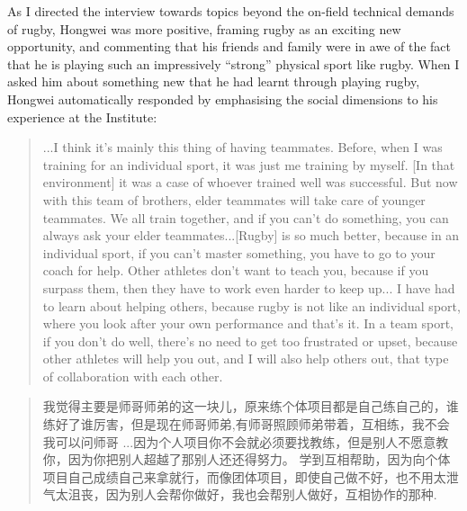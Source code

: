 \begin{CJK}{UTF8}{gbsn}
As I directed the interview towards topics beyond the on-field technical demands of rugby, Hongwei was more positive, framing rugby as an exciting new opportunity, and commenting that his friends and family were in awe of the fact that he is playing such an impressively ``strong'' physical sport like rugby.  When I asked him about something new that he had learnt through playing rugby, Hongwei automatically responded by emphasising the social dimensions to his experience at the Institute:

  \begin{quote}
    ...I think it's mainly this thing of having teammates. Before, when I was training for an individual sport, it was just me training by myself. [In that environment] it was a case of whoever trained well was successful.  But now with this team of brothers, elder teammates will take care of younger teammates. We all train together, and if you can’t do something, you can always ask your elder teammates...[Rugby] is so much better, because in an individual sport, if you can't master something, you have to go to your coach for help. Other athletes don't want to teach you, because if you surpass them, then they have to work even harder to keep up... I have had to learn about helping others, because rugby is not like an individual sport, where you look after your own performance and that's it.  In a team sport, if you don't do well, there's no need to get too frustrated or upset, because other athletes will help you out, and I will also help others out, that type of collaboration with each other.
  \end{quote}

\begin{CJK}{UTF8}{gbsn}
  \begin{quote}
    我觉得主要是师哥师弟的这一块儿，原来练个体项目都是自己练自己的，谁练好了谁厉害，但是现在师哥师弟,有师哥照顾师弟带着，互相练，我不会我可以问师哥
    ...因为个人项目你不会就必须要找教练，但是别人不愿意教你，因为你把别人超越了那别人还还得努力。 学到互相帮助，因为向个体项目自己成绩自己来拿就行，而像团体项目，即使自己做不好，也不用太泄气太沮丧，因为别人会帮你做好，我也会帮别人做好，互相协作的那种.
  \end{quote}
\end{CJK}


\end{CJK}
